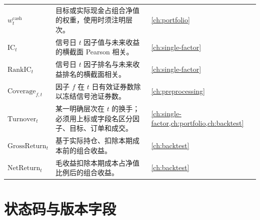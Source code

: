 \begin{longtable}{@{}p{3.2cm}p{9.0cm}p{2.8cm}@{}}
\(w^{\mathrm{cash}}_t\) & 目标或实际现金占组合净值的权重，使用时须注明层次。 & \cref{ch:portfolio} \\
\(\mathrm{IC}_t\) & 信号日 \(t\) 因子值与未来收益的横截面 Pearson 相关。 & \cref{ch:single-factor} \\
\(\mathrm{RankIC}_t\) & 信号日 \(t\) 因子排名与未来收益排名的横截面相关。 & \cref{ch:single-factor} \\
\(\mathrm{Coverage}_{f,t}\) & 因子 \(f\) 在 \(t\) 日有效证券数除以冻结信号池证券数。 & \cref{ch:preprocessing} \\
\(\mathrm{Turnover}_t\) & 某一明确层次在 \(t\) 的换手；必须用上标或字段名区分因子、目标、订单和成交。 & \cref{ch:single-factor,ch:portfolio,ch:backtest} \\
\(\mathrm{GrossReturn}_t\) & 基于实际持仓、扣除本期成本前的组合收益。 & \cref{ch:backtest} \\
\(\mathrm{NetReturn}_t\) & 毛收益扣除本期成本占净值比例后的组合收益。 & \cref{ch:backtest} \\
\bottomrule
\end{longtable}
\endgroup

\section{状态码与版本字段}

